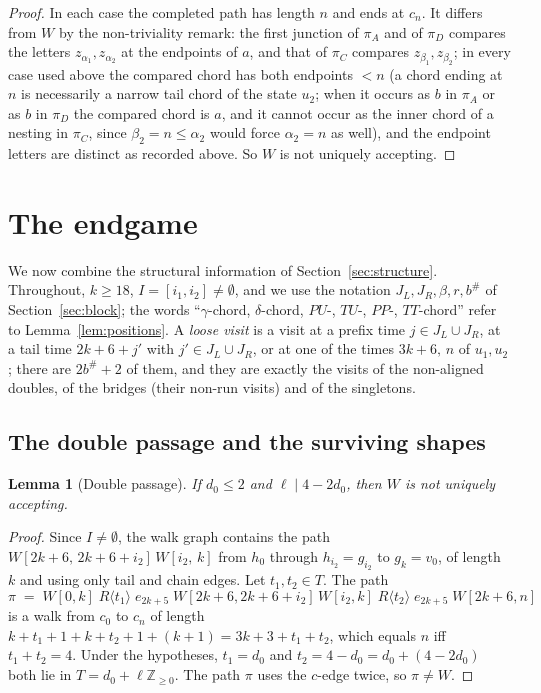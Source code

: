 \documentclass[11pt]{article}
\newtheorem{lemma}[theorem]{Lemma}
\theoremstyle{definition}
\newcommand{\Z}{\mathbb{Z}}
\begin{document}
\begin{proof}
In each case the completed path has length $n$ and ends at $c_n$. It
differs from $W$ by the non-triviality remark: the first junction of
$\pi_A$ and of $\pi_D$ compares the letters $z_{\alpha_1},z_{\alpha_2}$ at
the endpoints of $a$, and that of $\pi_C$ compares
$z_{\beta_1},z_{\beta_2}$; in every case used above the compared chord has
both endpoints $<n$ (a chord ending at $n$ is necessarily a narrow tail
chord of the state $u_2$; when it occurs as $b$ in $\pi_A$ or as $b$ in
$\pi_D$ the compared chord is $a$, and it cannot occur as the inner chord
of a nesting in $\pi_C$, since $\beta_2=n\le\alpha_2$ would force
$\alpha_2=n$ as well), and the endpoint letters are distinct as recorded
above. So $W$ is not uniquely accepting.
\end{proof}

\section{The endgame}\label{sec:endgame}

We now combine the structural information of Section~\ref{sec:structure}.
Throughout, $k\ge18$, $I=[i_1,i_2]\ne\emptyset$, and we use the notation
$J_L,J_R,\beta,r,b^{\#}$ of Section~\ref{sec:block}; the words
``$\gamma$-chord, $\delta$-chord, $PU$-, $TU$-, $PP$-, $TT$-chord'' refer to
Lemma~\ref{lem:positions}. A \emph{loose visit} is a visit at a prefix time
$j\in J_L\cup J_R$, at a tail time $2k+6+j'$ with $j'\in J_L\cup J_R$, or at
one of the times $3k+6,\,n$ of $u_1,u_2$; there are $2b^{\#}+2$ of them, and
they are exactly the visits of the non-aligned doubles, of the bridges (their
non-run visits) and of the singletons.

\subsection{The double passage and the surviving shapes}

\begin{lemma}[Double passage]\label{lem:dichotomy}
If $d_0\le2$ and $\ell\mid 4-2d_0$, then $W$ is not uniquely accepting.
\end{lemma}

\begin{proof}
Since $I\ne\emptyset$, the walk graph contains the path
$W[2k+6,\,2k+6+i_2]\,W[i_2,\,k]$ from $h_0$ through $h_{i_2}=g_{i_2}$ to
$g_k=v_0$, of length $k$ and using only tail and chain edges. Let
$t_1,t_2\in T$. The path
\[
\pi\;=\;W[0,k]\;R\langle t_1\rangle\;e_{2k+5}\;
W[2k+6,2k+6+i_2]\,W[i_2,k]\;R\langle t_2\rangle\;e_{2k+5}\;W[2k+6,n]
\]
is a walk from $c_0$ to $c_n$ of length $k+t_1+1+k+t_2+1+(k+1)=3k+3+t_1+t_2$,
which equals $n$ iff $t_1+t_2=4$. Under the hypotheses, $t_1=d_0$ and
$t_2=4-d_0=d_0+(4-2d_0)$ both lie in $T=d_0+\ell\Z_{\ge0}$. The path $\pi$
uses the $c$-edge twice, so $\pi\ne W$.
\end{proof}
\end{document}
